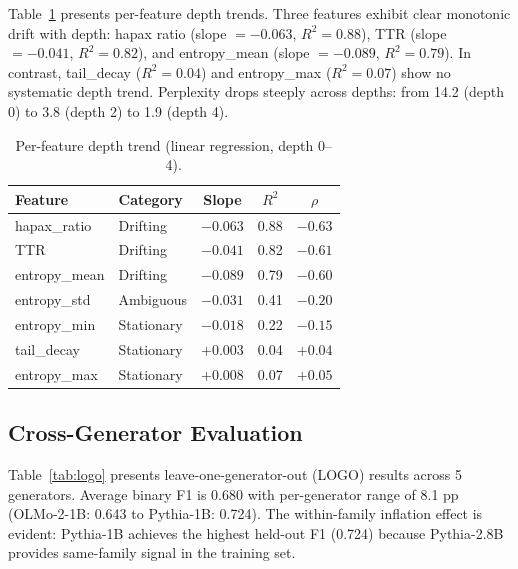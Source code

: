 \documentclass[11pt]{article}
\begin{document}
Table~\ref{tab:trends} presents per-feature depth trends. Three features exhibit clear monotonic drift with depth: hapax ratio (slope $= -0.063$, $R^2 = 0.88$), TTR (slope $= -0.041$, $R^2 = 0.82$), and entropy\_mean (slope $= -0.089$, $R^2 = 0.79$). In contrast, tail\_decay ($R^2 = 0.04$) and entropy\_max ($R^2 = 0.07$) show no systematic depth trend. Perplexity drops steeply across depths: from 14.2 (depth 0) to 3.8 (depth 2) to 1.9 (depth 4).

\begin{table}[t]
\centering
\small
\caption{Per-feature depth trend (linear regression, depth 0--4).}
\label{tab:trends}
\begin{tabular}{llccc}
\toprule
\textbf{Feature} & \textbf{Category} & \textbf{Slope} & \textbf{$R^2$} & \textbf{$\rho$} \\
\midrule
hapax\_ratio & Drifting & $-0.063$ & 0.88 & $-0.63$ \\
TTR & Drifting & $-0.041$ & 0.82 & $-0.61$ \\
entropy\_mean & Drifting & $-0.089$ & 0.79 & $-0.60$ \\
entropy\_std & Ambiguous & $-0.031$ & 0.41 & $-0.20$ \\
entropy\_min & Stationary & $-0.018$ & 0.22 & $-0.15$ \\
tail\_decay & Stationary & $+0.003$ & 0.04 & $+0.04$ \\
entropy\_max & Stationary & $+0.008$ & 0.07 & $+0.05$ \\
\bottomrule
\end{tabular}
\end{table}

\subsection{Cross-Generator Evaluation}
\label{sec:cross_gen}

Table~\ref{tab:logo} presents leave-one-generator-out (LOGO) results across 5 generators. Average binary F1 is 0.680 with per-generator range of 8.1 pp (OLMo-2-1B: 0.643 to Pythia-1B: 0.724). The within-family inflation effect is evident: Pythia-1B achieves the highest held-out F1 (0.724) because Pythia-2.8B provides same-family signal in the training set.
\end{document}
